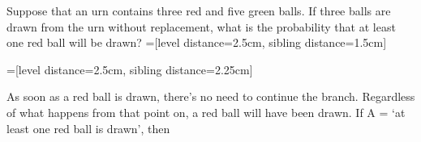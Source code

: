 \begin{examp}
Suppose that an urn contains three red and five green balls. If three balls are drawn from the urn without replacement, what is the probability that at least one red ball will be drawn?
=[level distance=2.5cm, sibling distance=1.5cm]
\begin{center}
=[level distance=2.5cm, sibling distance=2.25cm]
\end{center}
\par
\noindent As soon as a red ball is drawn, there's no need to continue the branch. Regardless of what happens from that point on, a red ball will have been drawn. If A = `at least one red ball is drawn', then 
\end{examp}
